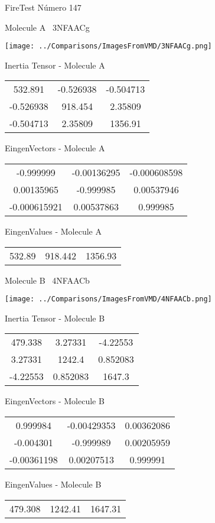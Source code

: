 \vtab[-3cm]
\begin{center}
{\large FireTest \tab Número 147}
\end{center}
\begin{multicols}{2}
\begin{center}

Molecule A \
3NFAACg

\texttt{[image: ../Comparisons/ImagesFromVMD/3NFAACg.png]}

Inertia Tensor - Molecule A \\
\begin{tabular}{|c c c|}
532.891	 & 	-0.526938	 & 	-0.504713	 \\
-0.526938	 & 	918.454	 & 	2.35809	 \\
-0.504713	 & 	2.35809	 & 	1356.91
\end{tabular}

\vtab
 EingenVectors - Molecule A     \\
\begin{tabular}{|c c c|}
-0.999999	 & 	-0.00136295	 & 	-0.000608598	 \\
0.00135965	 & 	-0.999985	 & 	0.00537946	 \\
-0.000615921	 & 	0.00537863	 & 	0.999985
\end{tabular}

\vtab
 EingenValues - Molecule A     \\
\begin{tabular}{|c c c|}
532.89	 & 	918.442	 & 	1356.93	 \\
\end{tabular}
\columnbreak

Molecule B \
4NFAACb

\texttt{[image: ../Comparisons/ImagesFromVMD/4NFAACb.png]}

Inertia Tensor - Molecule B \\
\begin{tabular}{|c c c|}
479.338	 & 	3.27331	 & 	-4.22553	 \\
3.27331	 & 	1242.4	 & 	0.852083	 \\
-4.22553	 & 	0.852083	 & 	1647.3
\end{tabular}

\vtab
 EingenVectors - Molecule B     \\
\begin{tabular}{|c c c|}
0.999984	 & 	-0.00429353	 & 	0.00362086	 \\
-0.004301	 & 	-0.999989	 & 	0.00205959	 \\
-0.00361198	 & 	0.00207513	 & 	0.999991
\end{tabular}

\vtab
 EingenValues - Molecule B     \\
\begin{tabular}{|c c c|}
479.308	 & 	1242.41	 & 	1647.31	 \\
\end{tabular}

\end{center}
\end{multicols}

